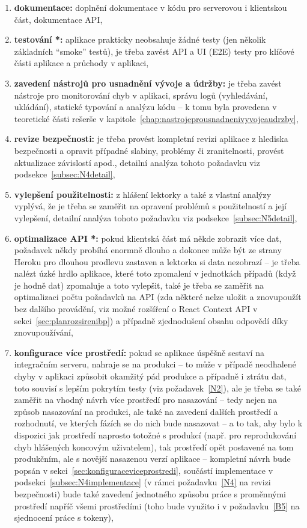 \begin{enumerate}[label=\textbf{N\arabic*}]
    \item \label{N1} \textbf{dokumentace:} doplnění dokumentace v kódu pro serverovou i klientskou část, dokumentace API,
    \item \label{N2} \textbf{testování *:} aplikace prakticky neobsahuje žádné testy (jen několik základních \enquote{smoke} testů), je třeba zavést API a UI (E2E) testy pro klíčové části aplikace a průchody v aplikaci,
    \item \label{N3} \textbf{zavedení nástrojů pro usnadnění vývoje a údržby:} je třeba zavést nástroje pro monitorování chyb v aplikaci, správu logů (vyhledávání, ukládání), statické typování a analýzu kódu -- k tomu byla provedena v teoretické části rešerše v kapitole~\ref{chap:nastrojeprousnadnenivyvojeaudrzby},
    \item \label{N4} \textbf{revize bezpečnosti:} je třeba provést kompletní revizi aplikace z hlediska bezpečnosti a opravit případné slabiny, problémy či zranitelnosti, provést aktualizace závislostí apod., detailní analýza tohoto požadavku viz podsekce~\ref{subsec:N4detail},
    \item \label{N5} \textbf{vylepšení použitelnosti:} z hlášení lektorky a také z vlastní analýzy vyplývá, že je třeba se zaměřit na opravení problémů s použitelností a její vylepšení, detailní analýza tohoto požadavku viz podsekce~\ref{subsec:N5detail},
    \item \label{N6} \textbf{optimalizace API *:} pokud klientská část má někde zobrazit více dat, požadavek někdy probíhá enormně dlouho a dokonce může být ze strany Heroku pro dlouhou prodlevu zastaven a lektorka si data nezobrazí -- je třeba nalézt úzké hrdlo aplikace, které toto zpomalení v jednotkách případů (když je hodně dat) zpomaluje a toto vylepšit, také je třeba se zaměřit na optimalizaci počtu požadavků na API (zda některé nelze uložit a znovupoužít bez dalšího provádění, viz možné rozšíření o React Context API v sekci~\ref{sec:planrozsirenibp}) a případně zjednodušení obsahu odpovědí díky znovupoužívání,
    \item \label{N7} \textbf{konfigurace více prostředí:} pokud se aplikace úspěšně sestaví na integračním serveru, nahraje se na produkci \cite{bp} -- to může v případě neodhalené chyby v aplikaci způsobit okamžitý pád produkce a případně i ztrátu dat, toto souvisí s lepším pokrytím testy (viz požadavek~\ref{N2}), ale je třeba se také zaměřit na vhodný návrh více prostředí pro nasazování -- tedy nejen na způsob nasazování na produkci, ale také na zavedení dalších prostředí a rozhodnutí, ve kterých fázích se do nich bude nasazovat -- a to tak, aby bylo k dispozici jak prostředí naprosto totožné s produkcí (např. pro reprodukování chyb hlášených koncovým uživatelem), tak prostředí opět postavené na tom produkčním, ale s novější nasazenou verzí aplikace -- kompletní návrh bude popsán v sekci~\ref{sec:konfiguraceviceprostredi}, součástí implementace v podsekci~\ref{subsec:N4implementace} (v rámci požadavku~\ref{N4} na revizi bezpečnosti) bude také zavedení jednotného způsobu práce s proměnnými prostředí napříč všemi prostředími (toho bude využito i v požadavku~\ref{B5} na sjednocení práce s tokeny),

\end{enumerate}
